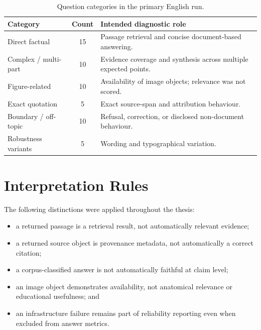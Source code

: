 \begin{table}[htbp]
  \centering
  \caption{Question categories in the primary English run.}
  \label{tab:rag-category-register}
  \begin{tabularx}{\textwidth}{L{0.30\textwidth}C Y}
    \toprule
    Category & Count & Intended diagnostic role \\
    \midrule
    Direct factual & 15 & Passage retrieval and concise document-based answering. \\
    Complex / multi-part & 10 & Evidence coverage and synthesis across multiple expected points. \\
    Figure-related & 10 & Availability of image objects; relevance was not scored. \\
    Exact quotation & 5 & Exact source-span and attribution behaviour. \\
    Boundary / off-topic & 10 & Refusal, correction, or disclosed non-document behaviour. \\
    Robustness variants & 5 & Wording and typographical variation. \\
    \bottomrule
  \end{tabularx}
\end{table}

\section{Interpretation Rules}
\label{app:rag-interpretation}

The following distinctions were applied throughout the thesis:
\begin{itemize}
  \item a returned passage is a retrieval result, not automatically relevant evidence;
  \item a returned source object is provenance metadata, not automatically a correct citation;
  \item a corpus-classified answer is not automatically faithful at claim level;
  \item an image object demonstrates availability, not anatomical relevance or educational usefulness; and
  \item an infrastructure failure remains part of reliability reporting even when excluded from answer metrics.
\end{itemize}
